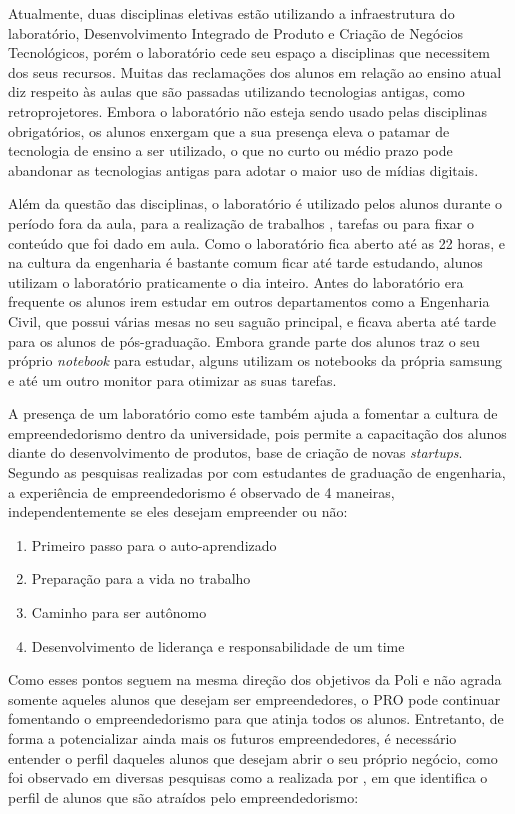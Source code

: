 Atualmente, duas disciplinas eletivas estão utilizando a infraestrutura do laboratório, Desenvolvimento Integrado de Produto e Criação de Negócios Tecnológicos, porém o laboratório cede seu espaço a disciplinas que necessitem dos seus recursos. Muitas das reclamações dos alunos em relação ao ensino atual diz respeito às aulas que são passadas utilizando tecnologias antigas, como retroprojetores. Embora o laboratório não esteja sendo usado pelas disciplinas obrigatórios, os alunos enxergam que a sua presença eleva o patamar de tecnologia de ensino a ser utilizado, o que no curto ou médio prazo pode abandonar as tecnologias antigas para adotar o maior uso de mídias digitais.

Além da questão das disciplinas, o laboratório é utilizado pelos alunos durante o período fora da aula, para a realização de trabalhos , tarefas ou para fixar o conteúdo que foi dado em aula. Como o laboratório fica aberto até as 22 horas, e na cultura da engenharia é bastante comum ficar até tarde estudando, alunos utilizam o laboratório praticamente o dia inteiro. Antes do laboratório era frequente os alunos irem estudar em outros departamentos como a Engenharia Civil, que possui várias mesas no seu saguão principal, e ficava aberta até tarde para os alunos de pós-graduação. Embora grande parte dos alunos traz o seu próprio \textit{notebook} para estudar, alguns utilizam os notebooks da própria samsung e até um outro monitor para otimizar as suas tarefas.

A presença de um laboratório como este também ajuda a fomentar a cultura de empreendedorismo dentro da universidade, pois permite a capacitação dos alunos diante do desenvolvimento de produtos, base de criação de novas \textit{startups}. Segundo as pesquisas realizadas por  com estudantes de graduação de engenharia, a experiência de empreendedorismo é observado de 4 maneiras, independentemente se eles desejam empreender ou não: 

\begin{enumerate}
\item Primeiro passo para o auto-aprendizado
\item Preparação para a vida no trabalho
\item Caminho para ser autônomo
\item Desenvolvimento de liderança e responsabilidade de um time
\end{enumerate}

Como esses pontos seguem na mesma direção dos objetivos da Poli e não agrada somente aqueles alunos que desejam ser empreendedores, o PRO pode continuar fomentando o empreendedorismo para que atinja todos os alunos. Entretanto, de forma a potencializar ainda mais os futuros empreendedores, é necessário entender o perfil daqueles alunos que desejam abrir o seu próprio negócio, como foi observado em diversas pesquisas como a realizada por , em que identifica o perfil de alunos que são atraídos pelo empreendedorismo:

